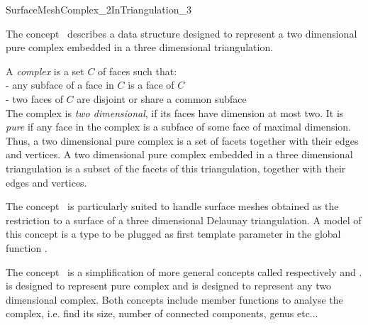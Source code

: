 

\begin{ccRefConcept}{SurfaceMeshComplex_2InTriangulation_3}


\ccDefinition
  
The concept \ccRefName\ describes a data structure
designed  to represent a  two dimensional pure complex 
embedded in a three dimensional triangulation.

A {\em complex} is a set $C$ of faces such that:\\
- any subface of a face in $C$ is a face of $C$ \\
- two faces of $C$ are disjoint or share a common subface \\
The complex is {\em two dimensional}, if its faces have dimension at most
two. It is {\em pure} if any face in the complex is a subface
of some face of maximal dimension.
Thus, a two dimensional pure complex is a set of facets
together with their edges and vertices.
A  two dimensional pure complex  embedded 
in a three dimensional triangulation
is a subset of the  facets 
of this triangulation, together with their edges and vertices.



The concept \ccRefName\  is particularly suited to handle
surface meshes obtained as the restriction to a surface of 
a  three dimensional Delaunay triangulation.
A model of this concept is a type to be plugged as first template
parameter in the global
function .


The concept \ccRefName\   is a simplification of more general concepts called
 respectively  and
.
 is  designed to represent  pure complex
and  is designed to represent any
two dimensional complex. 
Both concepts include member functions to analyse the complex,
i.e. find its size, number of connected components, genus etc... 


\end{ccRefConcept}
